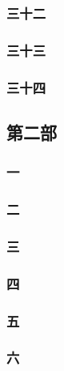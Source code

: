 \subsubsection*{三十二}




\subsubsection*{三十三}




\subsubsection*{三十四}





























\subsection*{第二部}




\subsubsection*{一}
\subsubsection*{二}
\subsubsection*{三}
\subsubsection*{四}
\subsubsection*{五}
\subsubsection*{六}

